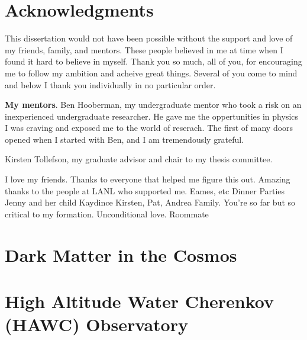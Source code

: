 \documentclass[PhD]{msu-thesis}
\begin{document}
\clearpage

\chapter*{Acknowledgments}
\DoubleSpacing

This dissertation would not have been possible without the support and love of my friends, family, and mentors.
These people believed in me at time when I found it hard to believe in myself.
Thank you so much, all of you, for encouraging me to follow my ambition and acheive great things.
Several of you come to mind and below I thank you individually in no particular order.

\textbf{My mentors}.
Ben Hooberman, my undergraduate mentor who took a risk on an inexperienced undergraduate researcher.
He gave me the oppertunities in physics I was craving and exposed me to the world of reserach.
The first of many doors opened when I started with Ben, and I am tremendously grateful.

Kirsten Tollefson, my graduate advisor and chair to my thesis committee.

I love my friends.
Thanks to everyone that helped me figure this out.
Amazing thanks to the people at LANL who supported me.
Eames, etc
Dinner Parties
Jenny and her child Kaydince
Kirsten, Pat, Andrea
Family. You're so far but so critical to my formation. Unconditional love.
Roommate

\clearpage
\SingleSpacing
\tableofcontents*
\clearpage

\listoftables
\clearpage

\listoffigures
\mainmatter

\chapter{Dark Matter in the Cosmos\label{sec:dm_cosmos}}


\chapter{High Altitude Water Cherenkov (HAWC) Observatory\label{sec:hawc}}

\end{document}
